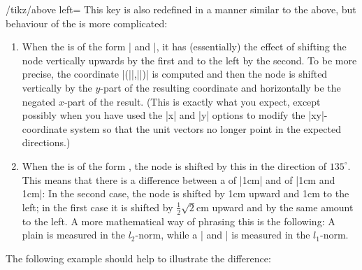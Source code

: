 \begin{key}{/tikz/above left=}
  This key is also redefined in a manner similar to the above, but
  behaviour of the  is more complicated:
  \begin{enumerate}
  \item When the  is of the form | and |, it has
    (essentially) the effect of shifting the node vertically upwards
    by the first  and to the left by the
    second. To be more precise, the coordinate |(||,||)| is computed
    and then the node is shifted vertically by the $y$-part of
    the resulting coordinate and horizontally be the negated $x$-part
    of the result. (This is exactly what you expect, except possibly
    when you have used the |x| and |y| options to modify the
    |xy|-coordinate system so that the unit  vectors no longer point
    in the expected directions.)
  \item When the  is of the form , the node is shifted by this  in the direction of $135^\circ$. This means that
    there is a difference between a  of |1cm| and
    of |1cm and 1cm|: In the second case, the node is shifted by 1cm
    upward and 1cm to the left; in the first case it is shifted by
    $\frac{1}{2}\sqrt{2}$cm upward and by the same amount to the
    left. A more mathematical way of phrasing this is the following: A
    plain  is measured in the $l_2$-norm, while a
    | and | is measured in the
    $l_1$-norm.
  \end{enumerate}
  The following example should help to illustrate the difference:
\begin{codeexample}[]
\end{codeexample}
\end{key}
